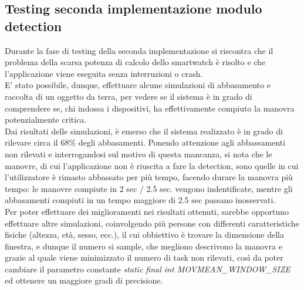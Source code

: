 \documentclass[a4paper, oneside]{book}
\begin{document}
\subsection{Testing seconda implementazione modulo detection}
Durante la fase di testing della seconda implementazione si riscontra che il problema della scarsa potenza di calcolo dello smartwatch è risolto e che l'applicazione viene eseguita senza interruzioni o crash. \\
E' stato possibile, dunque, effettuare alcune simulazioni di abbasamento e raccolta di un oggetto da terra, per vedere se il sistema è in grado di comprendere se, chi indossa i dispositivi, ha effettivamente compiuto la manovra potenzialmente critica.\\
Dai risultati delle simulazioni, è emerso che il sistema realizzato è in grado di rilevare circa il 68\% degli abbasamenti. Ponendo attenzione agli abbassamenti non rilevati e interrogandosi sul motivo di questa mancanza, si nota che le manovre, di cui l'applicazione non è riuscita a fare la detection, sono quelle in cui l'utilizzatore è rimasto abbassato per più tempo, facendo durare la manovra più tempo: le manovre compiute in 2 sec / 2.5 sec. vengono indentificate, mentre gli abbasamenti compiuti in un tempo maggiore di 2.5 sec passano inosservati. \\
Per poter effettuare dei miglioramenti nei risultati ottenuti, sarebbe opportuno effettuare altre simulazioni, coinvolgendo più persone con differenti caratteristiche fisiche (altezza, età, sesso, ecc.), il cui obbiettivo è trovare la dimensione della finestra, e dunque il numero si sample, che megliono descrivono la manovra e grazie al quale viene minimizzato il numero di task non rilevati, così da poter cambiare il parametro constante \textit{static final int MOVMEAN\_WINDOW\_SIZE} ed ottenere un maggiore gradi di precisione.
\clearpage
\end{document}
